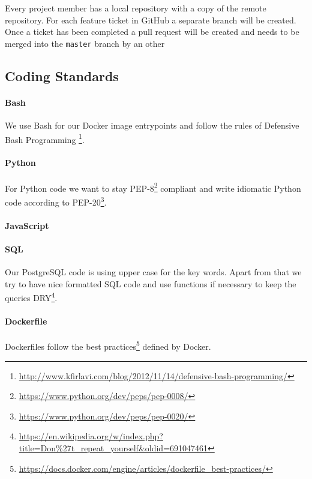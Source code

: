 Every project member has a local repository with a copy of the remote
repository. For each feature ticket in GitHub a separate branch
will be created. Once a ticket has been completed a pull request will be
created and needs to be merged into the \texttt{master} branch by an other 

\subsection{Coding Standards}

\paragraph{Bash} We use Bash for our Docker image entrypoints and follow
the rules of Defensive Bash Programming \footnote{\url{http://www.kfirlavi.com/blog/2012/11/14/defensive-bash-programming/}}.

\paragraph{Python} For Python code we want to stay PEP-8\footnote{\url{https://www.python.org/dev/peps/pep-0008/}} compliant and write idiomatic Python code according to PEP-20\footnote{\url{https://www.python.org/dev/peps/pep-0020/}}.

\paragraph{JavaScript}


\paragraph{SQL} Our PostgreSQL code is using upper case for the key words. Apart from that we try to have nice formatted SQL code and use functions
if necessary to keep the queries DRY\footnote{\url{https://en.wikipedia.org/w/index.php?title=Don%27t_repeat_yourself&oldid=691047461}}.

\paragraph{Dockerfile} Dockerfiles follow the best practices\footnote{\url{https://docs.docker.com/engine/articles/dockerfile_best-practices/}} defined by Docker.

